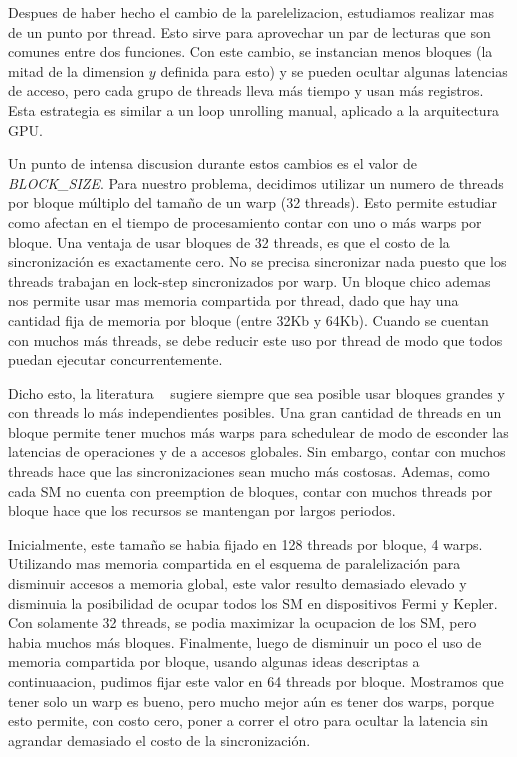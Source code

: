Despues de haber hecho el cambio de la parelelizacion, estudiamos realizar
mas de un punto por thread. Esto sirve para aprovechar un par de lecturas que son comunes
entre dos funciones. Con este cambio, se instancian menos bloques (la mitad de la dimension $y$
definida para esto) y se pueden ocultar algunas latencias de acceso, pero
cada grupo de threads lleva m\'as tiempo y usan m\'as registros. Esta estrategia es similar
a un loop unrolling manual, aplicado a la arquitectura GPU.

Un punto de intensa discusion durante estos cambios es el valor de \textit{BLOCK\_SIZE}.
Para nuestro problema, decidimos utilizar un numero de threads por bloque m\'ultiplo del
tama\~no de un warp (32 threads). Esto permite estudiar como afectan en el tiempo de
procesamiento contar con uno o m\'as warps por bloque. Una ventaja de usar bloques de
32 threads, es que el costo de la sincronizaci\'on es exactamente cero. No se precisa
sincronizar nada puesto que los threads trabajan en lock-step sincronizados por warp.
Un bloque chico ademas nos permite usar mas memoria compartida por thread, dado que hay una
cantidad fija de memoria por bloque (entre 32Kb y 64Kb). Cuando se cuentan con muchos m\'as
threads, se debe reducir este uso por thread de modo que todos puedan ejecutar concurrentemente.

Dicho esto, la literatura ~\cite{farberCuda} sugiere siempre que sea posible
usar bloques grandes y con threads lo m\'as independientes posibles. Una gran cantidad de threads
en un bloque permite tener muchos m\'as warps para schedulear de modo de esconder las latencias de
operaciones y de a accesos globales. Sin embargo, contar con muchos threads hace que las
sincronizaciones sean mucho m\'as costosas. Ademas, como cada SM no cuenta con preemption
de bloques, contar con muchos threads por bloque hace que los recursos se mantengan
por largos periodos.

Inicialmente, este tama\~no se habia fijado en 128 threads por bloque, 4 warps. Utilizando
mas memoria compartida en el esquema de paralelizaci\'on para disminuir accesos a memoria global,
este valor resulto demasiado elevado y disminuia la posibilidad de ocupar todos los SM en dispositivos
Fermi y Kepler. Con solamente 32 threads, se podia maximizar la ocupacion de los SM, pero habia
muchos m\'as bloques. Finalmente, luego de disminuir un poco el uso de memoria compartida por
bloque, usando algunas ideas descriptas a continuaacion, pudimos fijar este valor en 64 threads
por bloque. Mostramos que tener solo un warp es bueno, pero mucho mejor a\'un es tener dos warps, porque
esto permite, con costo cero, poner a correr el otro para ocultar la latencia sin agrandar
demasiado el costo de la sincronizaci\'on.


